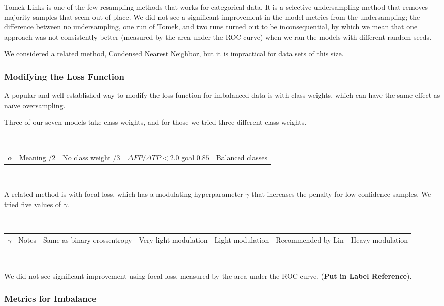 Tomek Links is one of the few resampling methods that works for categorical data.  It is a selective undersampling method that removes majority samples that seem out of place.  We did not see a significant improvement in the model metrics from the undersampling; the difference between no undersampling, one run of Tomek, and two runs turned out to be inconsequential, by which we mean that one approach was not consistently better (measured by the area under the ROC curve) when we ran the models with different random seeds.  

We considered a related method, Condensed Nearest Neighbor, but it is impractical for data sets of this size.  


\subsubsection{Modifying the Loss Function}

A popular and well established way to modify the loss function for imbalanced data is with class weights, which can have the same effect as na{\"i}ve oversampling.  

Three of our seven models take class weights, and for those we tried three different class weights.  

\

\hfil\begin{tabular}{c|l}
	$\alpha$ & Meaning \cr{}/2 & No class weight /3 & $\Delta FP/\Delta TP < 2.0$ goal \cr
	$0.85$ & Balanced classes \cr 
\end{tabular}

\


A related method is with focal loss, which has a modulating hyperparameter $\gamma$ that increases the penalty for low-confidence samples. \citep{lin2017focal}  We tried five values  of $\gamma$.

\

\hfil\begin{tabular}{c|c}
	$\gamma$  & Notes \cr{} & Same as binary crossentropy  & Very light modulation  & Light modulation & Recommended by Lin  & Heavy modulation \cr
\end{tabular}	

\

We did not see significant improvement using focal loss, measured by the area under the ROC curve.  ({\bf Put in Label Reference}).

\subsubsection{Metrics for Imbalance}


